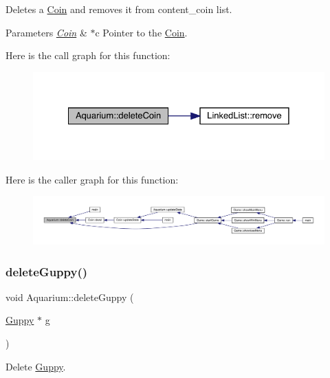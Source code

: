 Deletes a \mbox{\hyperlink{class_coin}{Coin}} and removes it from content\+\_\+coin list. 
\begin{DoxyParams}{Parameters}
{\em \mbox{\hyperlink{class_coin}{Coin}}} & $\ast$c Pointer to the \mbox{\hyperlink{class_coin}{Coin}}. \\
\hline
\end{DoxyParams}
Here is the call graph for this function\+:\nopagebreak
\begin{figure}[H]
\begin{center}
\leavevmode
\includegraphics[width=328pt]{class_aquarium_a187e59dd6efd62b577e97b8e00237c77_cgraph}
\end{center}
\end{figure}
Here is the caller graph for this function\+:
\nopagebreak
\begin{figure}[H]
\begin{center}
\leavevmode
\includegraphics[width=350pt]{class_aquarium_a187e59dd6efd62b577e97b8e00237c77_icgraph}
\end{center}
\end{figure}
\mbox{\label{class_aquarium_ae2372aef40d9474573833262b6062eb2}} 
\subsubsection{\texorpdfstring{delete\+Guppy()}{deleteGuppy()}}
{\footnotesize\ttfamily void Aquarium\+::delete\+Guppy (\begin{DoxyParamCaption}\item[{\mbox{\hyperlink{class_guppy}{Guppy}} $\ast$}]{g }\end{DoxyParamCaption})}



Delete \mbox{\hyperlink{class_guppy}{Guppy}}. 

